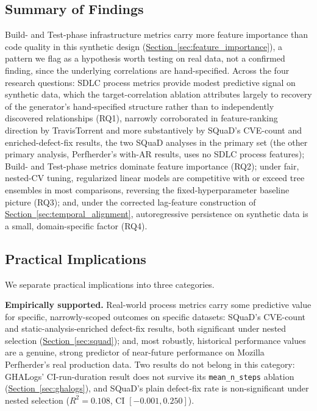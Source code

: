 \documentclass[technologies,article,submit,pdftex,moreauthors]{Definitions/mdpi}
\begin{document}
\subsection{Summary of Findings}\label{sec:summary_findings}

Build- and Test-phase infrastructure metrics carry more feature importance than code quality in this synthetic design (\hyperref[sec:feature_importance]{Section~\ref*{sec:feature_importance}}), a pattern we flag as a hypothesis worth testing on real data, not a confirmed finding, since the underlying correlations are hand-specified. Across the four research questions: SDLC process metrics provide modest predictive signal on synthetic data, which the target-correlation ablation attributes largely to recovery of the generator's hand-specified structure rather than to independently discovered relationships (RQ1), narrowly corroborated in feature-ranking direction by TravisTorrent and more substantively by SQuaD's CVE-count and enriched-defect-fix results, the two SQuaD analyses in the primary set (the other primary analysis, Perfherder's with-AR results, uses no SDLC process features); Build- and Test-phase metrics dominate feature importance (RQ2); under fair, nested-CV tuning, regularized linear models are competitive with or exceed tree ensembles in most comparisons, reversing the fixed-hyperparameter baseline picture (RQ3); and, under the corrected lag-feature construction of \hyperref[sec:temporal_alignment]{Section~\ref*{sec:temporal_alignment}}, autoregressive persistence on synthetic data is a small, domain-specific factor (RQ4).

\subsection{Practical Implications}\label{sec:practical_implications}

We separate practical implications into three categories.

\textbf{Empirically supported.} Real-world process metrics carry some predictive value for specific, narrowly-scoped outcomes on specific datasets: SQuaD's CVE-count and static-analysis-enriched defect-fix results, both significant under nested selection (\hyperref[sec:squad]{Section~\ref*{sec:squad}}); and, most robustly, historical performance values are a genuine, strong predictor of near-future performance on Mozilla Perfherder's real production data. Two results do not belong in this category: GHALogs' CI-run-duration result does not survive its \texttt{mean\_n\_steps} ablation (\hyperref[sec:ghalogs]{Section~\ref*{sec:ghalogs}}), and SQuaD's plain defect-fix rate is non-significant under nested selection (\(R^2 = 0.108\), CI \([-0.001, 0.250]\)).
\end{document}
